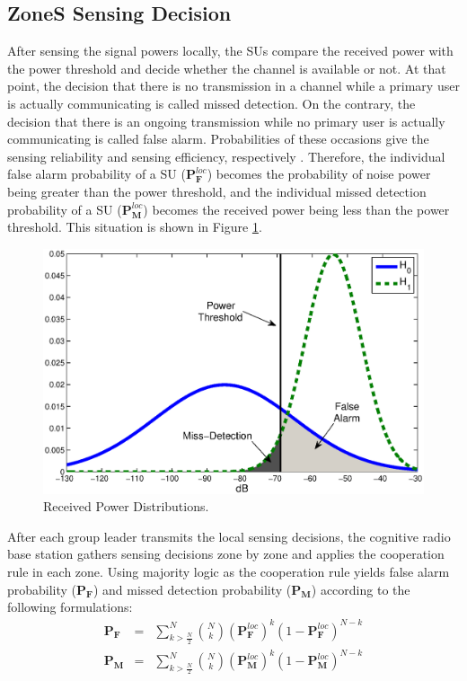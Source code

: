 \documentclass[conference,compsoc]{IEEEtran}
\newcommand{\probf}{\mathbf{P_F}}
\newcommand{\probm}{\mathbf{P_M}}
\newcommand{\probmlocal}{\mathbf{P}_\mathbf{M}^{loc}}
\newcommand{\probflocal}{\mathbf{P}_\mathbf{F}^{loc}}
\newcommand{\CR}{cognitive radio }
\begin{document}
\subsection{ZoneS Sensing Decision}
After sensing the signal powers locally, the SUs compare the received power with the power threshold and decide whether the channel is available or not. At that point, the decision that there is no transmission in a channel while a primary user is actually communicating is called missed detection. On the contrary, the decision that there is an ongoing transmission while no primary user is actually communicating is called false alarm. Probabilities of these occasions give the sensing reliability and sensing efficiency, respectively \cite{UpToDateSensing}. Therefore, the individual false alarm probability of a SU ($\probflocal$) becomes the probability of noise power being greater than the power threshold, and the individual missed detection probability of a SU ($\probmlocal$) becomes the received power being less than the power threshold. This situation is shown in Figure \ref{fig:h0h1}.
\begin{figure}[!htb]
\centering
\includegraphics[width=0.99\columnwidth,keepaspectratio] {figs/h0_h1.eps}
\caption{Received Power Distributions.}
\label{fig:h0h1}
\end{figure}

After each group leader transmits the local sensing decisions, the \CR base station gathers sensing decisions zone by zone and applies the cooperation rule in each zone. Using majority logic as the cooperation rule yields false alarm probability ($\probf$) and missed detection probability ($\probm$) according to the following formulations:
\begin{equation}
    \begin{array}{lcl}
        \probf & = & \sum\limits_{ k > \frac{N}{2}}^N {N \choose k}(\probflocal)^k(1-\probflocal)^{N-k} \\
        \probm & = & \sum\limits_{ k > \frac{N}{2}}^N {N \choose k}(\probmlocal)^k(1-\probmlocal)^{N-k}
    \end{array}
\end{equation}
\end{document}
